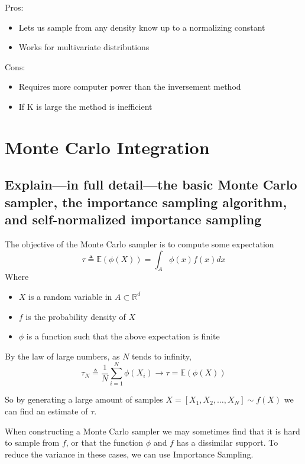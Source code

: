 \documentclass[a4paper]{article}
\begin{document}
Pros:
\begin{itemize}
    \item Lets us sample from any density know up to a normalizing constant
    \item Works for multivariate distributions
\end{itemize}

Cons:
\begin{itemize}
    \item Requires more computer power than the inversement method
    \item If K is large the method is inefficient
\end{itemize}
\newpage
\section{Monte Carlo Integration}

\subsection[The Monte Carlo Method and Importance Sampling]{Explain—in full detail—the basic Monte Carlo sampler, the importance sampling algorithm, and self-normalized importance sampling}

The objective of the Monte Carlo sampler is to compute some expectation
\begin{equation}
    \tau \triangleq \mathbb{E}(\phi(X)) = \int_A\phi(x)f(x)dx
\end{equation}
Where
\begin{itemize}
    \item $X$ is a random variable in $A \subset \mathbb{R}^d$
    \item $f$ is the probability density of $X$
    \item $\phi$ is a function such that the above expectation is finite
\end{itemize}

By the law of large numbers, as $N$ tends to infinity,
\begin{equation}
    \tau_N \triangleq \frac{1}{N}\sum_{i=1}^N\phi(X_i) \rightarrow \tau = \mathbb{E}(\phi(X))
\end{equation}

So by generating a large amount of samples $X = [X_1, X_2, \dots, X_N] \sim f(X)$ we can find an estimate of $\tau$.

When constructing a Monte Carlo sampler we may sometimes find that it is hard to sample from $f$, or that the function $\phi$ and $f$ has a dissimilar support. To reduce the variance in these cases, we can use Importance Sampling.
\end{document}
